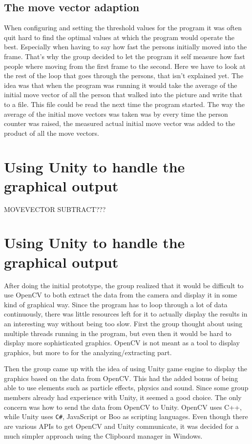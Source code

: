 \subsection{The move vector adaption}
When configuring and setting the threshold values for the program it was often quit hard to find the optimal values at which the program would operate the best. Especially when having to say how fast the persons initially moved into the frame. That's why the group decided to let the program it self measure how fast people where moving from the first frame to the second. Here we have to look at the rest of the loop that goes through the persons, that isn't explained yet. The idea was that when the program was running it would take the average of the initial move vector of all the person that walked into the picture and write that to a file. This file could be read the next time the program started. The way the average of the initial move vectors was taken was by every time the person counter was raised, the measured actual initial move vector was added to the product of all the move vectors. 

\section{Using Unity to handle the graphical output}

MOVEVECTOR SUBTRACT???

\section{Using Unity to handle the graphical output}\label{unityStart}
After doing the initial prototype, the group realized that it would be difficult to use OpenCV to both extract the data from the camera and display it in some kind of graphical way. Since the program has to loop through a lot of data continuously, there was little resources left for it to actually display the results in an interesting way without being too slow. First the group thought about using multiple threads running in the program, but even then it would be hard to display more sophisticated graphics. OpenCV is not meant as a tool to display graphics, but more to for the analyzing/extracting part.

Then the group came up with the idea of using Unity game engine to display the graphics based on the data from OpenCV. This had the added bonus of being able to use elements such as particle effects, physics and sound. Since some group members already had experience with Unity, it seemed a good choice. The only concern was how to send the data from OpenCV to Unity. OpenCV uses C++, while Unity uses \texttt{C\#}, JavaScript or Boo as scripting languages. Even though there are various APIs to get OpenCV and Unity communicate, it was decided for a much simpler approach using the Clipboard manager in Windows.

